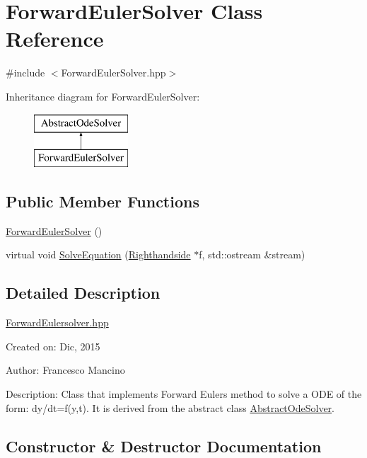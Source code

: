 \hypertarget{class_forward_euler_solver}{}\section{Forward\+Euler\+Solver Class Reference}
\label{class_forward_euler_solver}


{\ttfamily \#include $<$Forward\+Euler\+Solver.\+hpp$>$}

Inheritance diagram for Forward\+Euler\+Solver\+:\begin{figure}[H]
\begin{center}
\leavevmode
\includegraphics[height=2.000000cm]{class_forward_euler_solver}
\end{center}
\end{figure}
\subsection*{Public Member Functions}
\begin{DoxyCompactItemize}
\item 
\hyperlink{class_forward_euler_solver_a56271b4e9c08874b64e20981f4004294}{Forward\+Euler\+Solver} ()
\item 
virtual void \hyperlink{class_forward_euler_solver_af1d0ccddde281d136a99362743c80fe7}{Solve\+Equation} (\hyperlink{class_righthandside}{Righthandside} $\ast$f, std\+::ostream \&stream)
\end{DoxyCompactItemize}


\subsection{Detailed Description}
\hyperlink{_forward_euler_solver_8hpp_source}{Forward\+Eulersolver.\+hpp}

Created on\+: Dic, 2015 \begin{DoxyVerb}Author: Francesco Mancino
\end{DoxyVerb}


Description\+: Class that implements Forward Eulers method to solve a O\+D\+E of the form\+: dy/dt=f(y,t). It is derived from the abstract class \hyperlink{class_abstract_ode_solver}{Abstract\+Ode\+Solver}. 

\subsection{Constructor \& Destructor Documentation}
\hypertarget{class_forward_euler_solver_a56271b4e9c08874b64e20981f4004294}{}
